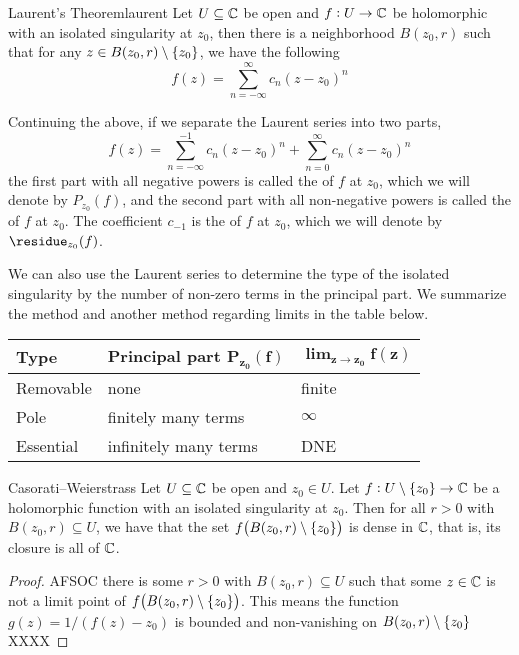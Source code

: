 \documentclass{styles/tufte}
\begin{document}
  \begin{theorem}{Laurent's Theorem}{laurent}
    Let $U \subseteq \mathbb{C}$ be open and $f: U \to \mathbb{C}$ be holomorphic with an isolated singularity at $z_0$, then there is a neighborhood $B(z_0, r)$ such that for any $z \in B(z_0, r) \setminus \set{z_0}$, we have the following 
    \[ f(z) = \sum_{n=-\infty}^\infty c_n (z - z_0)^n \]
  \end{theorem}
  
  \begin{definition}{}{}
    Continuing the above, if we separate the Laurent series into two parts,
    \[ f(z) = \sum_{n=-\infty}^{-1} c_n (z - z_0)^n + \sum_{n=0}^\infty c_n (z - z_0)^n \]
    the first part with all negative powers is called the  of $f$ at $z_0$, which we will denote by $P_{z_0}(f)$, and the second part with all non-negative powers is called the  of $f$ at $z_0$. The coefficient $c_{-1}$ is the  of $f$ at $z_0$, which we will denote by $\residue_{z_0}(f)$.
  \end{definition}
  
  We can also use the Laurent series to determine the type of the isolated singularity by the number of non-zero terms in the principal part. We summarize the method and another method regarding limits in the table below.
    
  \begin{table}[h]
  \centering
  \begin{tabular}{l|l|l}
    \textbf{Type} & \textbf{Principal part} $\bm{P_{z_0}(f)}$ & $\bm{\lim_{z \to z_0} f(z)}$ \\ \hline
    Removable & none & finite \\
    Pole & finitely many terms & $\infty$ \\
    Essential & infinitely many terms & DNE
  \end{tabular}
  \end{table}
  
  \begin{theorem}{Casorati--Weierstrass}{}
    Let $U \subseteq \mathbb{C}$ be open and $z_0 \in U$. Let $f: U \setminus \set{z_0} \to \mathbb{C}$ be a holomorphic function with an isolated singularity at $z_0$. Then for all $r > 0$ with $B(z_0, r) \subseteq U$, we have that the set $f\left(B(z_0, r) \setminus \set{z_0}\right)$ is dense in $\mathbb{C}$, that is, its closure is all of $\mathbb{C}$.
  \end{theorem}
  \begin{proof}
    AFSOC there is some $r > 0$ with $B(z_0, r) \subseteq U$ such that some $z \in \mathbb{C}$ is not a limit point of $f\left(B(z_0, r) \setminus \set{z_0}\right)$. This means the function $g(z) = 1/(f(z) - z_0)$ is bounded and non-vanishing on $B(z_0, r) \setminus \set{z_0}$ XXXX
  \end{proof}
  
\end{document}
